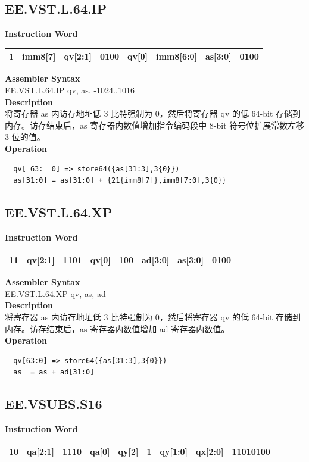 \clearpage
\subsection{EE.VST.L.64.IP}\label{instruction:EEVSTL64IP}
\setlength\tabcolsep{6pt}
\textbf{Instruction Word} \\
\begin{tabular}{|c|c|c|c|c|c|c|c|}
	\hline
	1 & imm8[7] & qv[2:1] & 0100 & qv[0] & imm8[6:0] & as[3:0] & 0100 \\
	\hline
\end{tabular}

\textbf{Assembler Syntax} \\
EE.VST.L.64.IP qv, as, -1024..1016 \\
\textbf{Description} \\
将寄存器 as 内访存地址低 3 比特强制为 0，然后将寄存器 qv 的低 64-bit 存储到内存。访存结束后，as 寄存器内数值增加指令编码段中 8-bit 符号位扩展常数左移 3 位的值。\\
\textbf{Operation}
\begin{lstlisting}
  qv[ 63:  0] => store64({as[31:3],3{0}})
  as[31:0] = as[31:0] + {21{imm8[7]},imm8[7:0],3{0}}
\end{lstlisting}

\clearpage
\subsection{EE.VST.L.64.XP}\label{instruction:EEVSTL64XP}
\setlength\tabcolsep{6pt}
\textbf{Instruction Word} \\
\begin{tabular}{|c|c|c|c|c|c|c|c|}
	\hline
	11 & qv[2:1] & 1101 & qv[0] & 100 & ad[3:0] & as[3:0] & 0100 \\
	\hline
\end{tabular}

\textbf{Assembler Syntax} \\
EE.VST.L.64.XP qv, as, ad \\
\textbf{Description} \\
将寄存器 as 内访存地址低 3 比特强制为 0，然后将寄存器 qv 的低 64-bit 存储到内存。访存结束后，as 寄存器内数值增加 ad 寄存器内数值。\\
\textbf{Operation}
\begin{lstlisting}
  qv[63:0] => store64({as[31:3],3{0}})
  as  = as + ad[31:0]
\end{lstlisting}

\clearpage
\subsection{EE.VSUBS.S16}\label{instruction:EEVSUBSS16}
\setlength\tabcolsep{6pt}
\textbf{Instruction Word} \\
\begin{tabular}{|c|c|c|c|c|c|c|c|c|}
	\hline
	10 & qa[2:1] & 1110 & qa[0] & qy[2] & 1 & qy[1:0] & qx[2:0] & 11010100 \\
	\hline
\end{tabular}

